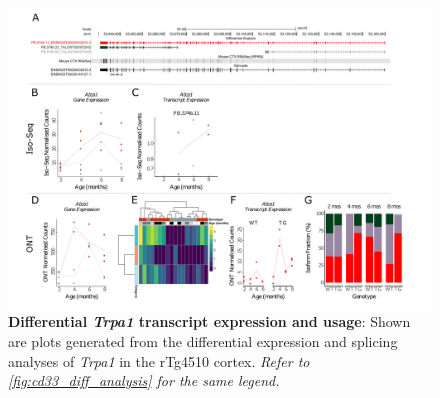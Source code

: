 \begin{landscape}
	\begin{figure}[htp]
		\begin{center}
			\includegraphics[page=19,trim={0 0.5cm 0 1.5cm},scale =0.85]{Figures/TargetGene_DifferentialAnalysis.pdf}
		\end{center}
		\captionsetup{width=1.5\textwidth}
		\caption[Differential \textit{Trpa1} transcript expression and usage]%
		{\textbf{Differential \textit{Trpa1} transcript expression and usage}: Shown are plots generated from the differential expression and splicing analyses of \textit{Trpa1} in the rTg4510 cortex. \textit{Refer to \cref{fig:cd33_diff_analysis} for the same legend.}}   
		\label{fig:Trpa1_diff_analysis}
	\end{figure}
\end{landscape}

